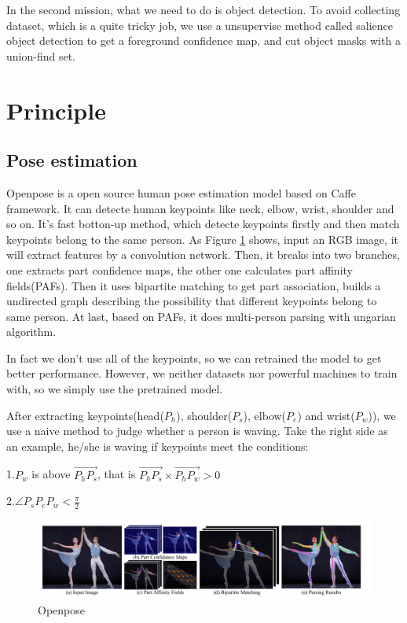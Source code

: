 \documentclass[UTF8]{article}
\begin{document}
    In the second mission, what we need to do is object detection. To avoid collecting dataset, which is a quite tricky job, we use a unsupervise method called salience object detection to get a foreground confidence map, and cut object masks with a union-find set.

\section{Principle}
  \subsection{Pose estimation}
    Openpose is a open source human pose estimation model based on Caffe framework. It can detecte human keypoints like neck, elbow, wrist, shoulder and so on. It's fast botton-up method, which detecte keypoints firstly and then match keypoints belong to the same person.
    As Figure \ref{img_1} shows, input an RGB image, it will extract features by a convolution network. Then, it breaks into two branches, one extracts part confidence maps, the other one calculates part affinity fields(PAFs). Then it uses bipartite matching to get part association, builds a undirected graph describing the possibility that different keypoints belong to same person. At last, based on PAFs, it does multi-person parsing with ungarian algorithm.

    In fact we don't use all of the keypoints, so we can retrained the model to get better performance. However, we neither datasets nor powerful machines to train with, so we simply use the pretrained model.

    After extracting keypoints(head($P_h$), shoulder($P_s$), elbow($P_e$) and wrist($P_w$)), we use a naive method to judge whether a person is waving. Take the right side as an example, he/she is waving if keypoints meet the conditions:

    1.$P_w$ is above $\overrightarrow{P_hP_s}$, that is $\overrightarrow{P_hP_s} \times \overrightarrow{P_hP_w} > 0$

    2.$\angle P_sP_eP_w < \frac{\pi}{2}$

    \begin{figure}
      \includegraphics[width=\linewidth]{a.png}
      \caption{Openpose}
      \label{img_1}
      \end{figure}
\end{document}
